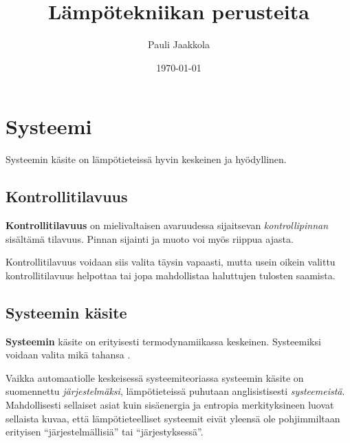 \documentclass[12pt,a4paper,finnish]{book}
\title{Lämpötekniikan perusteita}
\date{\today}
\author{Pauli Jaakkola}
\begin{document}
\maketitle
\newpage
{}
\tableofcontents
\newpage
{}

% 

\chapter{Systeemi} %

Systeemin käsite on lämpötieteissä hyvin keskeinen ja hyödyllinen.

\section{Kontrollitilavuus} \label{section:kontrollitilavuus}

\textbf{Kontrollitilavuus} on mielivaltaisen avaruudessa sijaitsevan \textit{kontrollipinnan} sisältämä tilavuus. 
Pinnan sijainti ja muoto voi myös riippua ajasta. 

Kontrollitilavuus voidaan siis valita täysin vapaasti, 
mutta usein oikein valittu kontrollitilavuus helpottaa tai jopa mahdollistaa haluttujen tulosten 
saamista.

\section{Systeemin käsite}

\textbf{Systeemin} käsite on erityisesti termodynamiikassa keskeinen. Systeemiksi voidaan valita mikä tahansa 
.

Vaikka automaatiolle keskeisessä systeemiteoriassa systeemin käsite on suomennettu \textit{järjestelmäksi},
lämpötieteissä puhutaan anglisistisesti \textit{systeemeistä}. Mahdollisesti sellaiset asiat kuin 
sisäenergia ja entropia merkityksineen luovat sellaista kuvaa, että lämpötieteelliset systeemit eivät 
yleensä ole pohjimmiltaan erityisen ``järjestelmällisiä'' tai ``järjestyksessä''.
\end{document}
